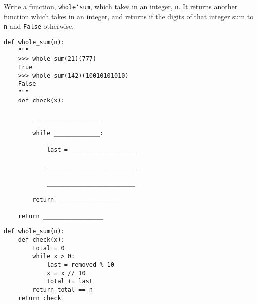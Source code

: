 \begin{blocksection}
\question Write a function, \texttt{whole\char`sum}, which takes in an integer, \texttt{n}. It returns another function which takes in an integer, and returns  if the digits of that integer sum to \texttt{n} and \texttt{False} otherwise.

\begin{lstlisting}
def whole_sum(n): 
    """ 
    >>> whole_sum(21)(777)
    True
    >>> whole_sum(142)(10010101010)
    False
    """
    def check(x):

        ___________________
		
        while _____________:
		
            last = __________________
				
            _________________________
				
            _________________________
				
        return __________________
		
    return _________________

\end{lstlisting}

\begin{solution}
\begin{lstlisting}
def whole_sum(n):
    def check(x):
        total = 0
        while x > 0:
            last = removed % 10
            x = x // 10
            total += last
        return total == n
    return check
\end{lstlisting}
\end{solution}
\end{blocksection}
